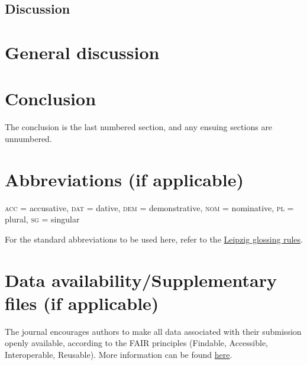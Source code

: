 \documentclass[times,linguex,xcolor]{glossa}
\begin{document}
\subsection{Discussion}

\section{General discussion}



\section{Conclusion}

The conclusion is the last numbered section, and any ensuing sections are unnumbered.

\pagebreak
\section*{Abbreviations (if applicable)}\label{abbrev}

\textsc{acc} = accusative, \textsc{dat} = dative, \textsc{dem} = demonstrative, \textsc{nom} = nominative, \textsc{pl} = plural, \textsc{sg} = singular

For the standard abbreviations to be used here, refer to the \href{https://www.eva.mpg.de/lingua/resources/glossing-rules.php}{Leipzig glossing rules}.

\section*{Data availability/Supplementary files (if applicable)}

The journal encourages authors to make all data associated with their submission openly available, according to the FAIR principles (Findable, Accessible, Interoperable, Reusable). More information can be found \href{https://www.glossa-journal.org/site/editorial-policies/#data-policy}{here}.
\end{document}
